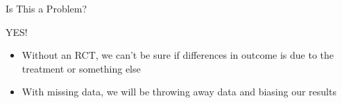 \begin{frame}{Is This a Problem?}

\begin{center}
 {\Huge{YES!}}
\end{center}
  \begin{itemize}
   \item Without an RCT, we can't be sure if differences in outcome is due to the treatment or something else
   \item With missing data, we will be throwing away data and biasing our results
  \end{itemize}


\end{frame}

